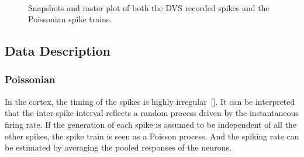\begin{figure}[hbt]
  \centering
  \\
  
  \caption{Snapshots and raster plot of both the DVS recorded spikes and the Poissonian spike trains.}
  \label{fig:zero}
\end{figure}

\subsection{Data Description}	
	\subsubsection{Poissonian}
	
	In the cortex, the timing of the spikes is highly irregular~[\cite{squire1998findings}].
	It can be interpreted that the inter-spike interval reflects a random process driven by the instantaneous firing rate.
	If the generation of each spike is assumed to be independent of all the other spikes, the spike train is seen as a Poisson process.
	And the spiking rate can be estimated by averaging the pooled responses of the neurons.
		
